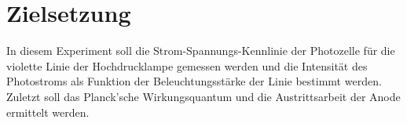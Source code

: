 \section{Zielsetzung}
\label{sec:Zielsetzung}

In diesem Experiment soll die Strom-Spannungs-Kennlinie der Photozelle für 
die violette Linie der Hochdrucklampe gemessen werden und die Intensität des 
Photostroms als Funktion der Beleuchtungsstärke der Linie bestimmt werden. 
Zuletzt soll das Planck'sche Wirkungsquantum und die Austrittsarbeit der 
Anode ermittelt werden.